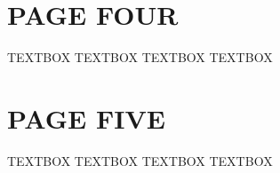 \documentclass[a4paper,landscape]{article}
\begin{document}
\newpage

\begin{minipage}[t]{0.45\linewidth}
        \vspace*{0.045\textheight}
        \section*{PAGE FOUR}
            \begin{center}
                \parbox{4.5in}{TEXTBOX TEXTBOX TEXTBOX TEXTBOX}

            \end{center}
\end{minipage}
\hspace{0.75in}%
\begin{minipage}[t]{0.45\linewidth}
\vspace*{0.045\textheight}
    \section*{PAGE FIVE}
        \begin{center}
            \parbox{4.5in}{TEXTBOX TEXTBOX TEXTBOX TEXTBOX}
        \end{center}
\end{minipage}%

\newpage
\end{document}
